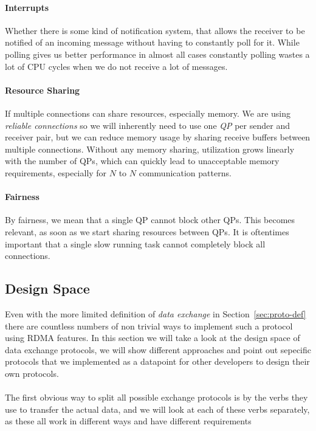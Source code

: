 \paragraph{Interrupts} Whether there is some kind of notification system, that allows the receiver to be notified 
of an incoming message without having to constantly poll for it. While polling gives us better performance in almost all cases
constantly polling wastes a lot of CPU cycles when we do not receive a lot of messages.

\paragraph{Resource Sharing} If multiple connections can share resources, especially memory. We are using \emph{reliable connections}
so we will inherently need to use one \emph{QP} per sender and receiver pair, but we can reduce memory usage by sharing receive 
buffers between multiple connections. Without any memory sharing, utilization grows linearly with the number of QPs, which 
can quickly lead to unacceptable memory requirements, especially for $N$ to $N$ communication patterns.

\paragraph{Fairness} By fairness, we mean that a single QP cannot block other QPs. This becomes relevant, as soon as we start
sharing resources between QPs. It is oftentimes important that a single slow running task cannot completely block all 
connections.




\subsection{Design Space}

Even with the more limited definition of \emph{data exchange} in Section~\ref{sec:proto-def} there are countless numbers
of non trivial ways to implement such a protocol using RDMA features. In this section we will take a look at the design 
space of data exchange protocols, we will show different approaches and point out sepecific protocols that we implemented
as a datapoint for other developers to design their own protocols.



\paragraph{} The first obvious way to split all possible exchange protocols is by the verbs they use to transfer the actual 
data, and we will look at each of these verbs separately, as these all work in different ways and have different requirements

